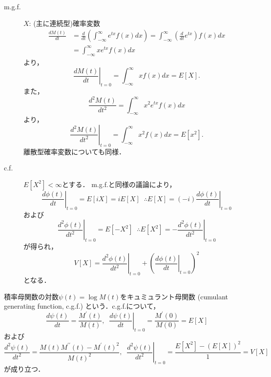 \documentclass{jsreport}
\begin{document}
\begin{description}
  \item[m.g.f.]
  $X$: (主に連続型)確率変数
  \begin{align}
    \frac{d M(t)}{dt} &= \frac{d}{dt} \left( \int_{-\infty}^{\infty} e^{tx} f(x) dx\right)
    = \int_{-\infty}^{\infty} \left(\frac{d}{dt} e^{tx}\right) f(x) dx \nonumber \\
    &= \int_{-\infty}^{\infty} x e^{tx} f(x) dx \nonumber
  \end{align}
  より，
  \begin{equation}
    \left.\frac{d M(t)}{dt}\right|_{t = 0} = \int_{-\infty}^{\infty} xf(x) dx = E[X]. \nonumber
  \end{equation}
  また，
  \begin{equation}
    \frac{d^2 M(t)}{dt^2} = \int_{-\infty}^{\infty} x^2 e^{tx} f(x) dx \nonumber
  \end{equation}
  より，
  \begin{equation}
    \left.\frac{d^2 M(t)}{dt^2}\right|_{t = 0} = \int_{-\infty}^{\infty} x^2 f(x) dx = E[x^2]. \nonumber
  \end{equation}
  離散型確率変数についても同様．
  \item[c.f.]
  $E[X^2] < \infty$とする．
  m.g.f.と同様の議論により，
  \begin{equation}
    \left.\frac{d \phi(t)}{dt}\right|_{t = 0} = E[iX] = i E[X] \; \; \therefore E[X] = (-i) \left.\frac{d \phi(t)}{dt}\right|_{t = 0} \nonumber
  \end{equation}
  および
  \begin{equation}
    \left.\frac{d^2 \phi(t)}{dt^2}\right|_{t = 0} = E[-X^2] \; \; \therefore E[X^2] = - \left.\frac{d^2 \phi(t)}{dt^2}\right|_{t = 0} \nonumber
  \end{equation}
  が得られ，
  \begin{equation}
    V[X] = \left.\frac{d^2 \phi(t)}{dt^2}\right|_{t = 0} + \left(\left.\frac{d \phi(t)}{dt}\right|_{t = 0}\right)^2 \nonumber
  \end{equation}
  となる．
\end{description}

積率母関数の対数$\psi(t) = \log M(t)$をキュミュラント母関数 (cumulant generating function, c.g.f.) という．c.g.f.について，
\begin{equation}
  \frac{d \psi(t)}{dt} = \frac{M^{\prime}(t)}{M(t)}, \; \; \left.\frac{d \psi(t)}{dt}\right|_{t = 0} = \frac{M^{\prime}(0)}{M(0)}  = E[X] \nonumber
\end{equation}
および
\begin{equation}
  \frac{d^2 \psi(t)}{dt^2} = \frac{M(t) M^{\prime \prime}(t) - M^{\prime}(t)^2}{M(t)^2}, \; \; \left.\frac{d^2 \psi(t)}{dt^2}\right|_{t = 0} = \frac{E[X^2] - (E[X])^2}{1} = V[X] \nonumber
\end{equation}
が成り立つ．
\end{document}
